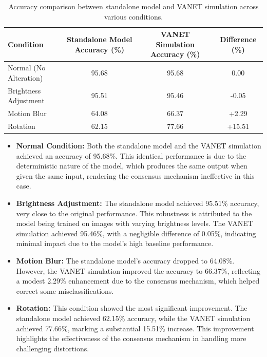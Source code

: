 \begin{table}[h!]
    \centering
    \begin{adjustbox}{width=\textwidth}
    \begin{tabular}{|l|c|c|c|}
        \hline
        \textbf{Condition} & \textbf{Standalone Model Accuracy (\%)} & \textbf{VANET Simulation Accuracy (\%)} & \textbf{Difference (\%)} \\ \hline
        Normal (No Alteration) & 95.68 & 95.68 & 0.00 \\ \hline
        Brightness Adjustment & 95.51 & 95.46 & -0.05 \\ \hline
        Motion Blur & 64.08 & 66.37 & +2.29 \\ \hline
        Rotation & 62.15 & 77.66 & +15.51 \\ \hline
    \end{tabular}
    \end{adjustbox}
    \caption{Accuracy comparison between standalone model and VANET simulation across various conditions.}
    \label{tab:accuracy_comparison}
\end{table}


\begin{itemize}
    \item \textbf{Normal Condition:} Both the standalone model and the VANET simulation achieved an accuracy of 95.68\%. This identical performance is due to the deterministic nature of the model, which produces the same output when given the same input, rendering the consensus mechanism ineffective in this case.
    
    \item \textbf{Brightness Adjustment:} The standalone model achieved 95.51\% accuracy, very close to the original performance. This robustness is attributed to the model being trained on images with varying brightness levels. The VANET simulation achieved 95.46\%, with a negligible difference of 0.05\%, indicating minimal impact due to the model's high baseline performance.
    
    \item \textbf{Motion Blur:} The standalone model's accuracy dropped to 64.08\%. However, the VANET simulation improved the accuracy to 66.37\%, reflecting a modest 2.29\% enhancement due to the consensus mechanism, which helped correct some misclassifications.
    
    \item \textbf{Rotation:} This condition showed the most significant improvement. The standalone model achieved 62.15\% accuracy, while the VANET simulation achieved 77.66\%, marking a substantial 15.51\% increase. This improvement highlights the effectiveness of the consensus mechanism in handling more challenging distortions.
\end{itemize}